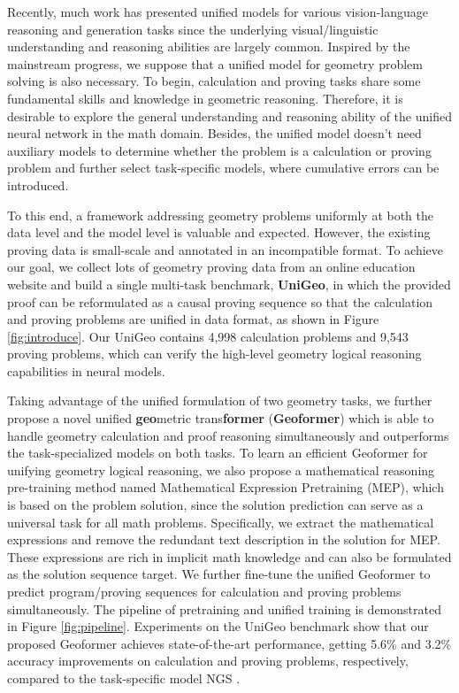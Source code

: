 \documentclass[11pt]{article}
\begin{document}
Recently, much work \cite{raffel2020exploring,cho2021unifying,lu2021iconqa,li2022blip,alayrac2022flamingo} has presented unified models for various vision-language reasoning and generation tasks since the underlying visual/linguistic understanding and reasoning abilities are largely common.
Inspired by the mainstream progress, we suppose that a unified model for geometry problem solving is also necessary.
To begin, calculation and proving tasks share some fundamental skills and knowledge in geometric reasoning. Therefore, it is desirable to explore the general understanding and reasoning ability of the unified neural network in the math domain.
Besides, the unified model doesn't need auxiliary models to determine whether the problem is a calculation or proving problem and further select task-specific models, where cumulative errors can be introduced.


To this end, a framework addressing geometry problems uniformly at both the data level and the model level is valuable and expected. However, the existing proving data is small-scale and annotated in an incompatible format. To achieve our goal, we collect lots of geometry proving data from an online education website and build a single multi-task benchmark, \textbf{UniGeo}, in which the provided proof can be reformulated as a causal proving sequence so that the calculation and proving problems are unified in data format, as shown in Figure \ref{fig:introduce}.
Our UniGeo contains 4,998 calculation problems and 9,543 proving problems, which can verify the high-level geometry logical reasoning capabilities in neural models.  


Taking advantage of the unified formulation of two geometry tasks, we further propose a novel unified \textbf{geo}metric trans\textbf{former} (\textbf{Geoformer}) which is able to handle geometry calculation and proof reasoning simultaneously and outperforms the task-specialized models on both tasks.
To learn an efficient Geoformer for unifying geometry logical reasoning, we also propose a mathematical reasoning pre-training method named Mathematical Expression Pretraining (MEP), which is based on the problem solution, since the solution prediction can serve as a universal task for all math problems. Specifically, we extract the mathematical expressions and remove the redundant text description in the solution for MEP. These expressions are rich in implicit math knowledge and can also be formulated as the solution sequence target. We further fine-tune the unified Geoformer to predict program/proving sequences for calculation and proving problems simultaneously.
The pipeline of pretraining and unified training is demonstrated in Figure \ref{fig:pipeline}.
Experiments on the UniGeo benchmark show that our proposed Geoformer achieves state-of-the-art performance, getting 5.6\% and 3.2\% accuracy improvements on calculation and proving problems, respectively, compared to the task-specific model NGS \cite{chen2021geoqa}.
\end{document}
